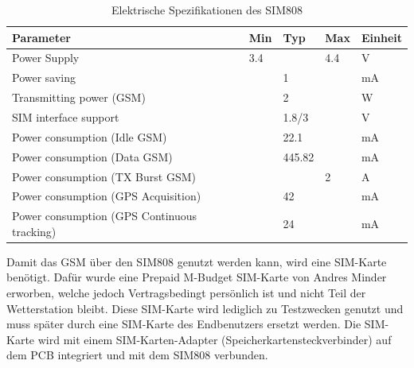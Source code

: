 \begin{table}[h]
\centering
  \caption{Elektrische Spezifikationen des SIM808 \cite{SIM808}}
\begin{tabular}{lllll}
\toprule 
\textbf{Parameter} & \textbf{Min} & \textbf{Typ} & \textbf{Max} & \textbf{Einheit} \\ 
\midrule 
Power Supply & 3.4 &  & 4.4 & V \\ 
Power saving &  & 1 &  & mA \\ 
Transmitting power (GSM) &  & 2 &  & W \\ 
SIM interface support &  & 1.8/3 &  & V \\ 
Power consumption (Idle GSM) &  & 22.1 &  & mA \\
Power consumption (Data GSM) &  & 445.82 &  & mA \\
Power consumption (TX Burst GSM) &  &  & 2 & A \\
Power consumption (GPS Acquisition) &  & 42 &  & mA \\ 
Power consumption (GPS Continuous tracking) &  & 24 &  & mA \\ 
\bottomrule
\end{tabular} 
\label{tab:SIM808} 
\end{table}

Damit das GSM über den SIM808 genutzt werden kann, wird eine SIM-Karte benötigt. Dafür wurde eine Prepaid M-Budget SIM-Karte von Andres Minder erworben, welche jedoch Vertragsbedingt persönlich ist und nicht Teil der Wetterstation bleibt. Diese SIM-Karte wird lediglich zu Testzwecken genutzt und muss später durch eine SIM-Karte des Endbenutzers ersetzt werden. Die SIM-Karte wird mit einem SIM-Karten-Adapter (Speicherkartensteckverbinder) auf dem PCB integriert und mit dem SIM808 verbunden.\\

